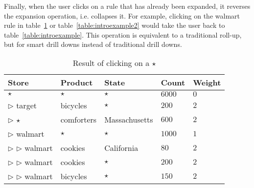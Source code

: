 Finally, when the user clicks on a rule that has already been expanded, it reverses the expansion operation, i.e. collapses it. For example, clicking on the walmart rule in table~\ref{table:introexample3} or table~\ref{table:introexample2} would take the user back to table~\ref{table:introexample}. This operation is equivalent to a traditional
roll-up, but for smart drill downs instead of traditional drill downs.
	
\begin{table}
\scriptsize
\centering
\begin{tabular}{| l | l | l | l | l |}
\hline Store & Product & State & Count & Weight \\
\hline
$\star$ & $\star$ & $\star$ & $6000$ & $0$ \\ \cline{1-5}
$\triangleright$ target & bicycles & $\star$ & $200$ & $2$ \\ \cline{1-5}
$\triangleright$ $\star$ & comforters & Massachusetts & $600$ & $2$ \\ \cline{1-5}
$\triangleright$ walmart & $\star$ & $\star$ & $1000$ & $1$ \\ \cline{2-5}
$\triangleright$ $\triangleright$ walmart & cookies & California & $80$ & $2$ \\ \cline{2-5}
$\triangleright$ $\triangleright$ walmart & cookies & $\star$ & $200$ & $2$ \\ \cline{2-5}
$\triangleright$ $\triangleright$ walmart & bicycles & $\star$ & $150$ & $2$ \\  \hline
\end{tabular}
\vspace{-10pt}
\caption{Result of clicking on a $\star$ \label{table:introexample3}}
\vspace{-10pt}
\end{table}

